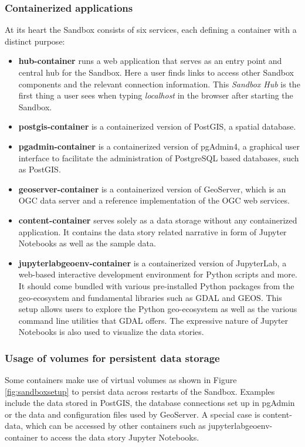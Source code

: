\documentclass[11pt, a4paper, oneside, parskip=full-]{scrartcl}
\begin{document}
\subsubsection*{Containerized applications}
At its heart the Sandbox consists of six services, each defining a container
with a distinct purpose:

\begin{itemize}
  \item \textbf{hub-container} runs a web application that serves as an entry
  point and central hub for the Sandbox. Here a user finds links to access other
  Sandbox components and the relevant connection information. This \emph{Sandbox
  Hub} is the first thing a user sees when typing \emph{localhost} in the
  browser after starting the Sandbox.
  \item \textbf{postgis-container} is a containerized version of PostGIS, a
  spatial database.
  \item \textbf{pgadmin-container} is a containerized version of pgAdmin4, a
  graphical user interface to facilitate the administration of PostgreSQL based
  databases, such as PostGIS.
  \item \textbf{geoserver-container} is a containerized version of GeoServer,
  which is an OGC data server and a reference implementation of the OGC web
  services.
  \item \textbf{content-container} serves solely as a data storage without any
  containerized application. It contains the data story related narrative in
  form of Jupyter Notebooks as well as the sample data.
  \item \textbf{jupyterlabgeoenv-container} is a containerized version of
  JupyterLab, a web-based interactive development environment for Python scripts
  and more. It should come bundled with various pre-installed Python packages
  from the geo-ecosystem and fundamental libraries such as GDAL and
  GEOS\cite{geos}. This setup allows users to explore the Python geo-ecosystem
  as well as the various command line utilities that GDAL offers. The expressive
  nature of Jupyter Notebooks is also used to visualize the data stories.
\end{itemize}

\subsubsection*{Usage of volumes for persistent data storage}
Some containers make use of virtual volumes as shown in Figure
\ref{fig:sandboxsetup} to persist data across restarts of the Sandbox. Examples
include the data stored in PostGIS, the database connections set up in pgAdmin
or the data and configuration files used by GeoServer. A special case is
content-data, which can be accessed by other containers such as
jupyterlabgeoenv-container to access the data story Jupyter Notebooks.
\end{document}
